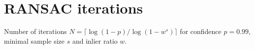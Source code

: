 \begin{center}
\small\setlength{\tabcolsep}{4pt}

\end{center}

\section*{RANSAC iterations}

Number of iterations $N = \lceil\log(1 - p)/\log(1 - w^s)\rceil$ for confidence $p = 0.99$, minimal sample size $s$ and inlier ratio $w$.

\begin{center}
\small

\end{center}
